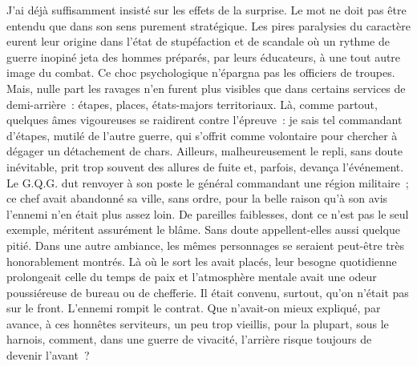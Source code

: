 \documentclass[french,twoside]{book} %
\begin{document}
J’ai déjà suffisamment insisté sur les effets de la surprise. Le mot ne doit pas être entendu que dans son sens purement stratégique. Les pires paralysies du caractère eurent leur origine dans l’état de stupéfaction et de scandale où un rythme de guerre inopiné jeta des hommes préparés, par leurs éducateurs, à une tout autre image du combat. Ce choc psychologique n’épargna pas les officiers de troupes. Mais,   nulle part les ravages n’en furent plus visibles que dans certains services de demi-arrière : étapes, places, états-majors territoriaux. Là, comme partout, quelques âmes vigoureuses se raidirent contre l’épreuve : je sais tel commandant d’étapes, mutilé de l’autre guerre, qui s’offrit comme volontaire pour chercher à dégager un détachement de chars. Ailleurs, malheureusement le repli, sans doute inévitable, prit trop souvent des allures de fuite et, parfois, devança l’événement. Le G.Q.G. dut renvoyer à son poste le général commandant une région militaire ; ce chef avait abandonné sa ville, sans ordre, pour la belle raison qu’à son avis l’ennemi n’en était plus assez loin. De pareilles faiblesses, dont ce n’est pas le seul exemple, méritent assurément le blâme. Sans doute appellent-elles aussi quelque pitié. Dans une autre ambiance, les mêmes personnages se seraient peut-être très honorablement montrés. Là où le sort les avait placés, leur besogne quotidienne prolongeait celle du temps de paix et l’atmosphère mentale avait une odeur poussiéreuse de bureau ou de chefferie. Il était convenu, surtout, qu’on n’était pas sur le front. L’ennemi rompit le contrat. Que n’avait-on mieux expliqué, par avance, à ces honnêtes serviteurs, un peu trop vieillis, pour la plupart, sous le harnois, comment, dans une guerre de vivacité, l’arrière risque toujours de devenir l’avant ?\par
\end{document}
